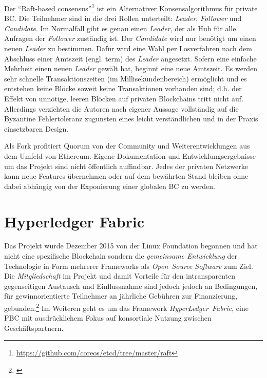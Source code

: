 
Der \enquote{Raft-based consensus}\footnote{\url{https://github.com/coreos/etcd/tree/master/raft}} ist ein Alternativer Konsensalgorithmus für private \gls{BC}. Die Teilnehmer sind in die drei Rollen unterteilt:
\emph{Leader}, \emph{Follower} und \emph{Candidate}. Im Normalfall gibt es genau einen \emph{Leader}, der als Hub für alle Anfragen der \emph{Follower} zuständig ist.
Der \emph{Candidate} wird nur benötigt um einen neuen \emph{Leader} zu bestimmen.
Dafür wird eine Wahl per Losverfahren nach dem Abschluss einer Amtszeit (engl. term) des \emph{Leader} angesetzt.
Sofern eine einfache Mehrheit einen neuen \emph{Leader} gewält hat, beginnt eine neue Amtszeit.
Es werden sehr schnelle Transaktionszeiten (im Millisekundenbereich) ermöglicht und es entstehen keine Blöcke soweit keine Transaktionen vorhanden sind;
d.h. der Effekt von unnötige, leeren Blöcken auf privaten Blockchains tritt nicht auf.
Allerdings verzichten die Autoren nach eigener Aussage vollständig auf die Byzantine Fehlertoleranz zugunsten eines leicht verständlichen und in der Praxis einsetzbaren Design. 

Als Fork profitiert Quorum von der Community und Weiterentwicklungen aus dem Umfeld von Ethereum.
Eigene Dokumentation und Entwicklungsergebnisse um das Projekt sind nicht öffentlich auffindbar. 
Jedes der privaten Netzwerke kann neue Features übernehmen oder auf dem bewährten Stand bleiben
ohne dabei abhängig von der Exponierung einer globalen \gls{BC} zu werden.

\section{Hyperledger Fabric}\label{impl:hyperledger}

Das Projekt wurde Dezember 2015 von der Linux Foundation begonnen und hat nicht eine spezifische Blockchain sondern die \emph{gemeinsame Entwicklung} der Technologie in Form mehrerer Frameworks als \emph{Open~Source Software} zum Ziel.
Die \emph{Mitgliedschaft} im Projekt und damit Vorteile für den intransparenten gegenseitigen Austausch und Einflussnahme sind jedoch jedoch an Bedingungen, für gewinnorientierte Teilnehmer an jährliche Gebühren zur Finanzierung, gebunden.\footnote{\cite{w:hyperledger:membership}}
Im Weiteren geht es um das Framework \emph{HyperLedger~Fabric}, eine \gls{PBC} mit ausdrücklichem Fokus auf konsortiale Nutzung zwischen Geschäftspartnern.

